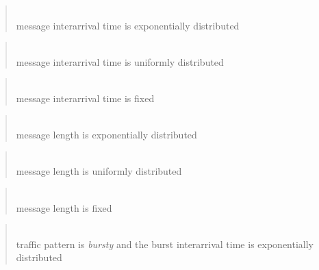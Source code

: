 \medskip

\begin{quote}
\noindent{}\\ \hspace{0in}
message interarrival time is exponentially distributed
\end{quote}

\begin{quote}
\noindent{}\\ \hspace{0in}
message interarrival time is uniformly distributed
\end{quote}

\begin{quote}
\noindent{}\\ \hspace{0in}
message interarrival time is fixed
\end{quote}

\begin{quote}
\noindent{}\\ \hspace{0in}
message length is exponentially distributed
\end{quote}

\begin{quote}
\noindent{}\\ \hspace{0in}
message length is uniformly distributed
\end{quote}

\begin{quote}
\noindent{}\\ \hspace{0in}
message length is fixed
\end{quote}

\begin{quote}
\noindent{}\\ \hspace{0in}
traffic pattern is {\em bursty\/}
and the burst interarrival time is exponentially distributed
\end{quote}

